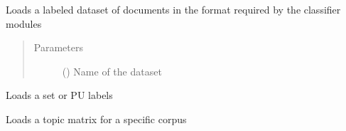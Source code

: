 \documentclass[letterpaper,10pt,english]{sphinxmanual}
\begin{document}
\begin{fulllineitems}
\begin{fulllineitems}
\begin{quote}
\begin{description}
\end{description}\end{quote}

\end{fulllineitems}


\begin{fulllineitems}
\label{\detokenize{dc_data_manager:src.data_manager.DataManager.load_dataset}}
\sphinxAtStartPar
Loads a labeled dataset of documents in the format required by the
classifier modules
\begin{quote}\begin{description}
\item[{Parameters}] \leavevmode
\sphinxAtStartPar
{} () \textendash{} Name of the dataset

\end{description}\end{quote}

\end{fulllineitems}


\begin{fulllineitems}
\label{\detokenize{dc_data_manager:src.data_manager.DataManager.load_labels}}
\sphinxAtStartPar
Loads a set or PU labels

\end{fulllineitems}


\begin{fulllineitems}
\label{\detokenize{dc_data_manager:src.data_manager.DataManager.load_topics}}
\sphinxAtStartPar
Loads a topic matrix for a specific corpus


\end{fulllineitems}
\end{fulllineitems}
\end{document}
